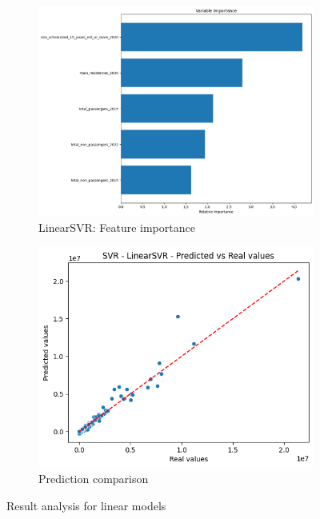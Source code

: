 \begin{figure}[h]
    \centering
    \begin{subfigure}[b]{0.35\textwidth}
         \centering
         \includegraphics[width=\textwidth]{assets/images/linearsvr-tuning-feature-importance.png}
         \caption{LinearSVR: Feature importance}
     \end{subfigure}
     \hfill
     \begin{subfigure}[b]{0.35\textwidth}
         \centering
         \includegraphics[width=\textwidth]{assets/images/linearsvr-tuning-ypred-vs-ytest.png}
         \caption{Prediction comparison}
     \end{subfigure}
     \caption{Result analysis for linear models}
\end{figure}

